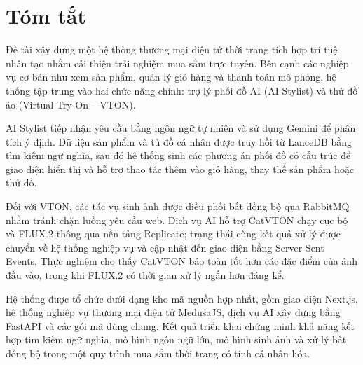\chapter*{Tóm tắt}
{}

Đề tài xây dựng một hệ thống thương mại điện tử thời trang tích hợp trí tuệ nhân tạo nhằm cải thiện trải nghiệm mua sắm trực tuyến. Bên cạnh các nghiệp vụ cơ bản như xem sản phẩm, quản lý giỏ hàng và thanh toán mô phỏng, hệ thống tập trung vào hai chức năng chính: trợ lý phối đồ AI (AI Stylist) và thử đồ ảo (Virtual Try-On -- VTON).

\medskip

AI Stylist tiếp nhận yêu cầu bằng ngôn ngữ tự nhiên và sử dụng Gemini để phân tích ý định. Dữ liệu sản phẩm và tủ đồ cá nhân được truy hồi từ LanceDB bằng tìm kiếm ngữ nghĩa, sau đó hệ thống sinh các phương án phối đồ có cấu trúc để giao diện hiển thị và hỗ trợ thao tác thêm vào giỏ hàng, thay thế sản phẩm hoặc thử đồ.

\medskip

Đối với VTON, các tác vụ sinh ảnh được điều phối bất đồng bộ qua RabbitMQ nhằm tránh chặn luồng yêu cầu web. Dịch vụ AI hỗ trợ CatVTON chạy cục bộ và FLUX.2 thông qua nền tảng Replicate; trạng thái cùng kết quả xử lý được chuyển về hệ thống nghiệp vụ và cập nhật đến giao diện bằng Server-Sent Events. Thực nghiệm cho thấy CatVTON bảo toàn tốt hơn các đặc điểm của ảnh đầu vào, trong khi FLUX.2 có thời gian xử lý ngắn hơn đáng kể.

\medskip

Hệ thống được tổ chức dưới dạng kho mã nguồn hợp nhất, gồm giao diện Next.js, hệ thống nghiệp vụ thương mại điện tử MedusaJS, dịch vụ AI xây dựng bằng FastAPI và các gói mã dùng chung. Kết quả triển khai chứng minh khả năng kết hợp tìm kiếm ngữ nghĩa, mô hình ngôn ngữ lớn, mô hình sinh ảnh và xử lý bất đồng bộ trong một quy trình mua sắm thời trang có tính cá nhân hóa.

\clearpage
